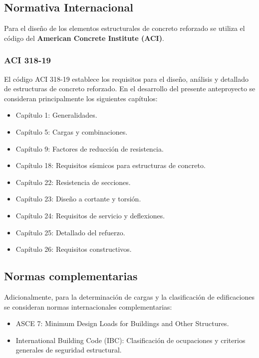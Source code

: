 \documentclass[14pt,letterpaper]{extarticle}
\begin{document}
	\subsection{Normativa Internacional}
	
	Para el diseño de los elementos estructurales de concreto reforzado se utiliza el código del \textbf{American Concrete Institute (ACI)}.
	
	\subsubsection{ACI 318-19}
	
	El código ACI 318-19 establece los requisitos para el diseño, análisis y detallado de estructuras de concreto reforzado. En el desarrollo del presente anteproyecto se consideran principalmente los siguientes capítulos:
	
	\begin{itemize}
		\item Capítulo 1: Generalidades.
		\item Capítulo 5: Cargas y combinaciones.
		\item Capítulo 9: Factores de reducción de resistencia.
		\item Capítulo 18: Requisitos sísmicos para estructuras de concreto.
		\item Capítulo 22: Resistencia de secciones.
		\item Capítulo 23: Diseño a cortante y torsión.
		\item Capítulo 24: Requisitos de servicio y deflexiones.
		\item Capítulo 25: Detallado del refuerzo.
		\item Capítulo 26: Requisitos constructivos.
	\end{itemize}
	
	\subsection{Normas complementarias}
	
	Adicionalmente, para la determinación de cargas y la clasificación de edificaciones se consideran normas internacionales complementarias:
	
	\begin{itemize}
		\item ASCE 7: Minimum Design Loads for Buildings and Other Structures.
		\item International Building Code (IBC): Clasificación de ocupaciones y criterios generales de seguridad estructural.
	\end{itemize}
	
\end{document}
